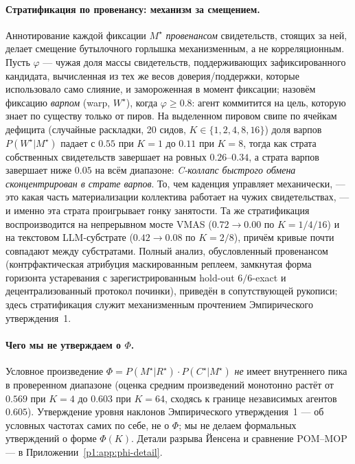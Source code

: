 \documentclass{article}
\begin{document}
\paragraph{Стратификация по провенансу: механизм за смещением.}
Аннотирование каждой фиксации $M^\star$ \emph{провенансом} свидетельств,
стоящих за ней, делает смещение бутылочного горлышка механизменным, а не
корреляционным. Пусть $\varphi$ --- чужая доля массы свидетельств,
поддерживающих зафиксированного кандидата, вычисленная из тех же весов
доверия/поддержки, которые использовало само слияние, и замороженная в момент фиксации; назовём фиксацию
\emph{варпом} (warp, $W^\star$), когда $\varphi \ge 0.8$: агент
коммитится на цель, которую знает по существу только от пиров. На
выделенном пировом свипе по ячейкам дефицита (случайные раскладки, 20
сидов, $K\in\{1,2,4,8,16\}$) доля варпов $P(W^\star|M^\star)$
падает с $0.55$ при $K{=}1$ до $0.11$ при $K{=}8$, тогда как страта
собственных свидетельств завершает на ровных $0.26$--$0.34$, а страта варпов
завершает ниже $0.05$ на всём диапазоне: \emph{C-коллапс
быстрого обмена сконцентрирован в страте варпов}. То, чем каденция
управляет механически, --- это какая часть материализации коллектива
работает на чужих свидетельствах, --- и именно эта страта проигрывает
гонку занятости. Та же стратификация
воспроизводится на непрерывном мосте VMAS ($0.72\to0.00$ по
$K{=}1/4/16$) и на текстовом LLM-субстрате ($0.42\to0.08$ по
$K{=}2/8$), причём кривые почти совпадают между субстратами. Полный
анализ, обусловленный провенансом (контрфактическая атрибуция маскированным
реплеем, замкнутая форма горизонта устаревания с зарегистрированным
hold-out $6/6$-exact и децентрализованный протокол починки), приведён в
сопутствующей рукописи; здесь стратификация служит
механизменным прочтением Эмпирического утверждения~1.

\paragraph{Чего мы не утверждаем о $\Phi$.} Условное произведение $\Phi = P(M^\star|R^\star)\!\cdot\!P(C^\star|M^\star)$ \emph{не} имеет внутреннего пика в проверенном диапазоне (оценка средним произведений монотонно растёт от $0.569$ при $K{=}4$ до $0.603$ при $K{=}64$, сходясь к границе независимых агентов $0.605$). Утверждение уровня наклонов Эмпирического утверждения~1 --- об условных частотах самих по себе, не о $\Phi$; мы не делаем формальных утверждений о форме $\Phi(K)$. Детали разрыва Йенсена и сравнение POM--MOP --- в Приложении~\ref{p1:app:phi-detail}.
\end{document}
